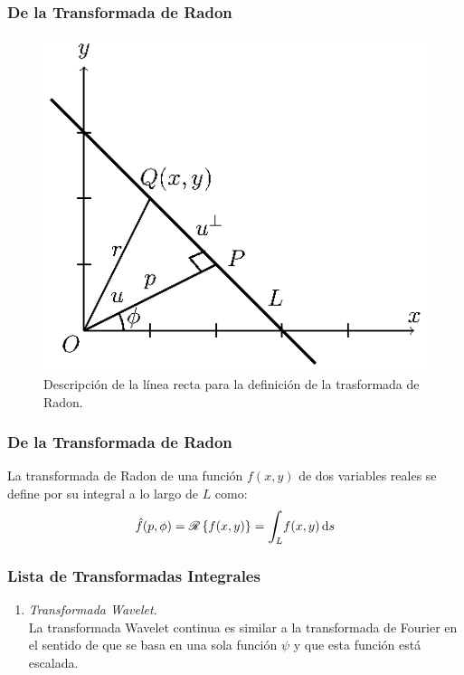 \documentclass[12pt]{beamer}
\begin{document}
\begin{frame}
\frametitle{De la Transformada de Radon}    
\begin{figure}[H]
    \centering
    \includegraphics[scale=1]{Imagenes/Figura_Transformada_Radon.eps}
    \caption{Descripción de la línea recta para la definición de la trasformada de Radon.}
    \label{eq:figura_Radon}
\end{figure}
\end{frame}
\begin{frame}
\frametitle{De la Transformada de Radon}
La transformada de Radon de una función $f (x, y)$ de dos variables reales se define por su integral a lo largo de $L$ como:
\begin{align}
\hat{f} (p, \phi) = \mathscr{R} \left\{ f(x, y) \right\} = \scaleint{6ex}_{\bs L} f (x, y) \dd{s}
\label{eq:ecuacion_18_2_1}
\end{align}
\end{frame}
\begin{frame}
\frametitle{Lista de Transformadas Integrales}
\begin{enumerate}[<+->]
\conti
\item \emph{Transformada Wavelet.}
\\
La transformada Wavelet continua es similar a la transformada de Fourier en el sentido de que se basa en una sola función $\psi$ y que esta función está escalada.
\seti
\end{enumerate}
\end{frame}
\end{document}
